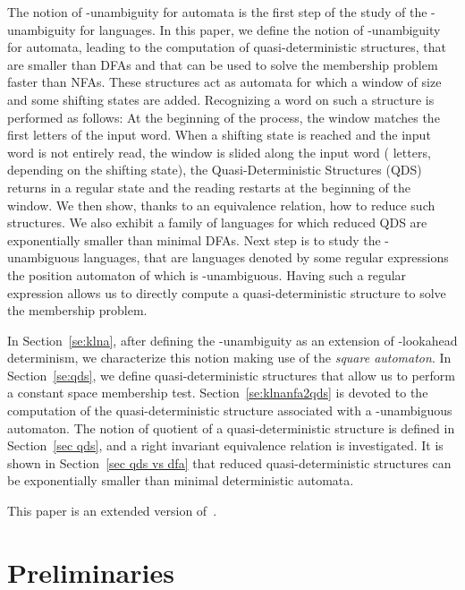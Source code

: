 \documentclass[11pt]{elsarticle}
\newcommand\modif[2]{{#2}}
\begin{document}
  The notion of -unambiguity for automata is the first step of the study of the -unambiguity for languages. In this paper,  
   we define the notion of -unambiguity for automata, leading to the computation of quasi-deterministic structures, that are smaller than DFAs and that can be used to solve the membership problem faster than NFAs.    
  These structures act as automata for which a window of size  and some shifting states are added. Recognizing a word on such a structure is performed as follows: At the beginning of the process, the window matches the  first letters of the input word. When a shifting state is reached and the input word is not entirely read, the window is slided along the input word ( letters, depending on the shifting state), the \modif{QDS}{Quasi-Deterministic Structures (QDS)} returns in a regular state and the reading restarts at the beginning of the window.
  We then show, thanks to an equivalence relation, how to reduce such structures. We also exhibit a family of languages for which reduced QDS are exponentially smaller than minimal DFAs.
  Next step is to study the -unambiguous languages, that are languages denoted by some  regular expressions the position automaton of which is -unambiguous. Having such a regular expression allows us to directly compute a quasi-deterministic structure to solve the membership problem.
  
  In Section~\ref{se:klna}, after defining the -unambiguity as an extension of -lookahead determinism, we characterize this notion making use of the \emph{square automaton}. 
  In Section~\ref{se:qds}, we define quasi-deterministic structures that allow us to perform a constant space membership test. Section~\ref{se:klnanfa2qds} is devoted to the computation of the quasi-deterministic structure associated with a -unambiguous automaton. The notion of quotient of a quasi-deterministic structure is defined in Section~\ref{sec qds}, and a right invariant equivalence relation is investigated. It is shown in Section~\ref{sec qds vs dfa} that reduced quasi-deterministic structures can be exponentially smaller than minimal \modif{deteministic}{deterministic} automata.
  
  \modif{}{This paper is an extended version of~\cite{CFM14}.}

\section{Preliminaries}\label{se:pre}
\end{document}

